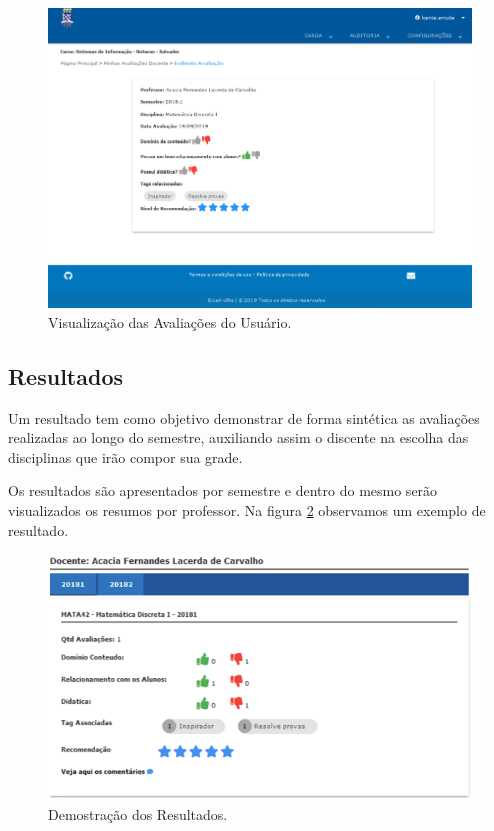 \documentclass[12pt, a4paper]{report}
\begin{document}
\begin{itemize}
\begin{figure}
\centering
\includegraphics[scale=0.5]{visualizacao_minha_avaliacao.png}
\caption{Visualização das Avaliações do Usuário.}
\label{fig:visualizacao_minha_avaliacao}
\end{figure}

\end{itemize}
\subsection{Resultados}
Um resultado tem como objetivo demonstrar de forma sintética as avaliações realizadas ao longo do semestre, auxiliando assim o discente na escolha das disciplinas que irão compor sua  grade.

Os resultados são apresentados por semestre e dentro do mesmo serão visualizados os resumos por professor. Na figura \ref{fig:resultados} observamos um exemplo de resultado.

\begin{figure}
\centering
\includegraphics[scale=0.7]{resultados.png}
\caption{Demostração dos Resultados.}
\label{fig:resultados}
\end{figure}
\end{document}

